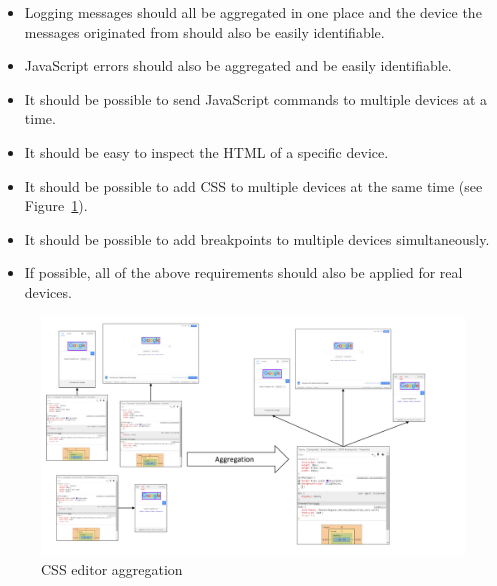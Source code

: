 \begin{itemize}
	\item Logging messages should all be aggregated in one place and the device the messages originated from should also be easily identifiable.
	\item JavaScript errors should also be aggregated and be easily identifiable.
	\item It should be possible to send JavaScript commands to multiple devices at a time. 
	\item It should be easy to inspect the HTML of a specific device.
	\item It should be possible to add CSS to multiple devices at the same time (see Figure~\ref{fig:css_aggregation}).
	\item It should be possible to add breakpoints to multiple devices simultaneously.
	\item If possible, all of the above requirements should also be applied for real devices.
\end{itemize}

\begin{figure}[H]
  \centering
    \includegraphics[width=1.0\textwidth]{images/css_aggregation.pdf}
	\caption[CSS editor aggregation]{CSS editor aggregation}
	\label{fig:css_aggregation}
\end{figure}

